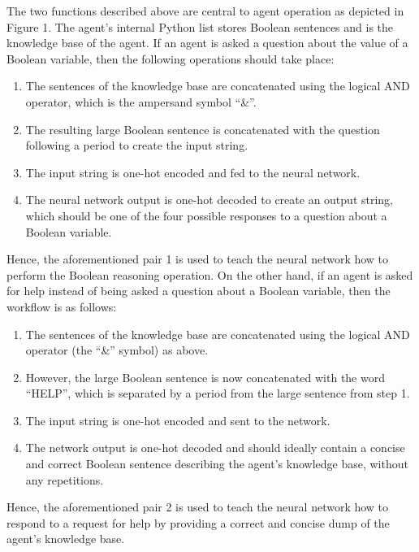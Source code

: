 \documentclass[
]{article}
\begin{document}
The two functions described above are central to agent operation as
depicted in Figure 1. The agent's internal Python list stores Boolean
sentences and is the knowledge base of the agent. If an agent is asked a
question about the value of a Boolean variable, then the following
operations should take place:

\begin{enumerate}
\def\labelenumi{\arabic{enumi}.}
\item
  The sentences of the knowledge base are concatenated using the logical
  AND operator, which is the ampersand symbol ``\&''.
\item
  The resulting large Boolean sentence is concatenated with the question
  following a period to create the input string.
\item
  The input string is one-hot encoded and fed to the neural network.
\item
  The neural network output is one-hot decoded to create an output
  string, which should be one of the four possible responses to a
  question about a Boolean variable.
\end{enumerate}

Hence, the aforementioned pair 1 is used to teach the neural network how
to perform the Boolean reasoning operation. On the other hand, if an
agent is asked for help instead of being asked a question about a
Boolean variable, then the workflow is as follows:

\begin{enumerate}
\def\labelenumi{\arabic{enumi}.}
\item
  The sentences of the knowledge base are concatenated using the logical
  AND operator (the ``\&'' symbol) as above.
\item
  However, the large Boolean sentence is now concatenated with the word
  ``HELP'', which is separated by a period from the large sentence from
  step 1.
\item
  The input string is one-hot encoded and sent to the network.
\item
  The network output is one-hot decoded and should ideally contain a
  concise and correct Boolean sentence describing the agent's knowledge
  base, without any repetitions.
\end{enumerate}

Hence, the aforementioned pair 2 is used to teach the neural network how
to respond to a request for help by providing a correct and concise dump
of the agent's knowledge base.
\end{document}
